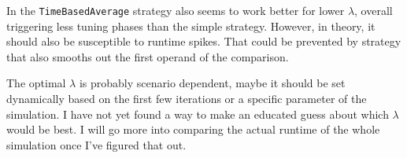 \documentclass[]{article}
\begin{document}
In the \texttt{TimeBasedAverage} strategy also seems to work better for lower $\lambda$, overall triggering less tuning phases than the simple strategy. However, in theory, it should also be susceptible to runtime spikes. That could be prevented by strategy that also smooths out the first operand of the comparison.

The optimal $\lambda$ is probably scenario dependent, maybe it should be set dynamically based on the first few iterations or a specific parameter of the simulation. I have not yet found a way to make an educated guess about which $\lambda$ would be best. I will go more into comparing the actual runtime of the whole simulation once I've figured that out.






\end{document}
